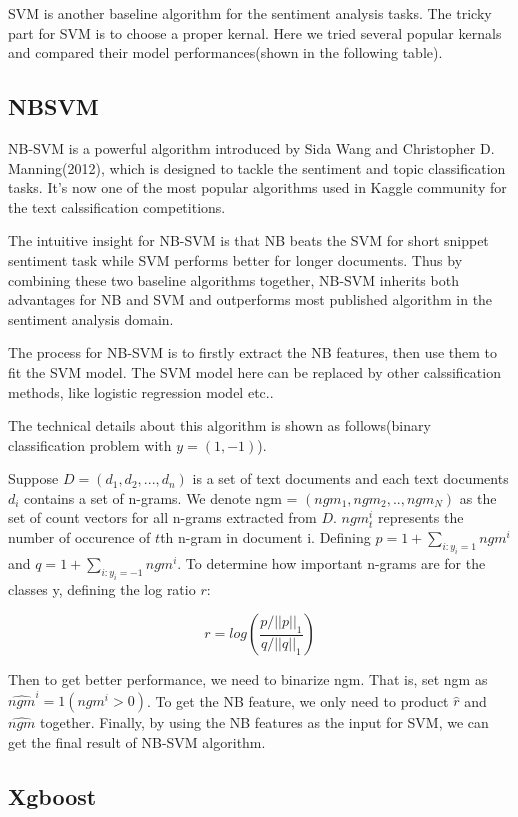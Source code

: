 \documentclass[letterpaper]{article} %
\begin{document}
SVM is another baseline algorithm for the sentiment analysis tasks. The tricky part for SVM is to choose a proper kernal. Here we tried several popular kernals and compared their model performances(shown in the following table).

\subsection{NBSVM}

NB-SVM is a powerful algorithm introduced by Sida Wang and Christopher D. Manning(2012)\cite{wang2012baselines}, which is designed to tackle the sentiment and topic classification tasks. It's now one of the most popular algorithms used in Kaggle community for the text calssification competitions.

The intuitive insight for NB-SVM is that NB beats the SVM for short snippet sentiment task while SVM performs better for longer documents. Thus by combining these two baseline algorithms together, NB-SVM inherits both advantages for NB and SVM and outperforms most published algorithm in the sentiment analysis domain.

The process for NB-SVM is to firstly extract the NB features, then use them to fit the SVM model. The SVM model here can be replaced by other calssification methods, like logistic regression model etc..

The technical details about this algorithm is shown as follows\cite{lebret2014n}(binary classification problem with $y=(1,-1)$).

Suppose $D = (d_1,d_2,...,d_n)$ is a set of text documents and each text documents $d_i$ contains a set of n-grams. We denote ngm = $(ngm_1,ngm_2,..,ngm_N)$ as the set of count vectors for all n-grams extracted from $D$. $ngm^i_t$ represents the number of occurence of $t$th n-gram in document i. Defining $p = 1+\sum_{i:y_i=1}ngm^i$ and $q=1+\sum_{i:y_i=-1}ngm^i$. To determine how important n-grams are for the classes y, defining the log ratio $r$:

$$r=log(\frac{p/||p||_1}{q/||q||_1})$$

Then to get better performance, we need to binarize ngm. That is, set ngm as $\hat{ngm}^{i}=1(ngm^i>0)$. To get the NB feature, we only need to product $\hat{r}$ and $\hat{ngm}$ together. Finally, by using the NB features as the input for SVM, we can get the final result of NB-SVM algorithm.

\subsection{Xgboost}
\end{document}
